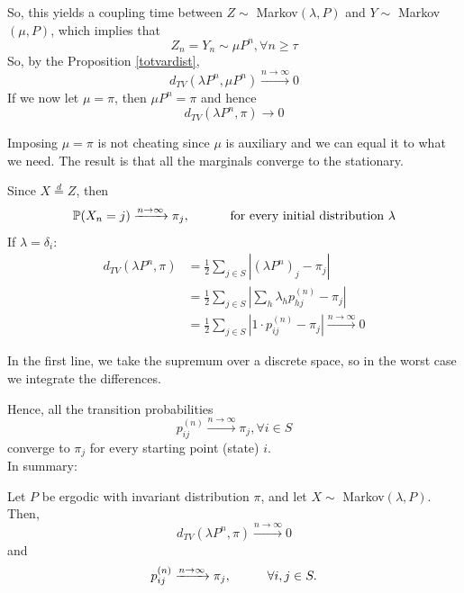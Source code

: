 \documentclass{article}
\begin{document}
So, this yields a coupling time between $Z \sim$ Markov$(\lambda, P)$ and $Y \sim$ Markov $(\mu, P)$, which implies that 
\begin{equation*}
    Z_n = Y_n \sim \mu P^n, \forall n \geq \tau
\end{equation*}
So, by the Proposition \ref{totvardist}, 
\begin{equation*}
    d_{TV}(\lambda P^n, \mu P^n) \xrightarrow{n \rightarrow \infty} 0
\end{equation*}
If we now let $\mu = \pi$, then $\mu P^n = \pi$ and hence 
\begin{equation*}
    d_{TV}(\lambda P^n, \pi) \rightarrow 0
\end{equation*}
\begin{remark}
        Imposing $\mu = \pi$ is not cheating since $\mu$ is auxiliary and we can equal it to what we need. The result is that all the marginals converge to the stationary. 
\end{remark}
Since $X \stackrel{d} = Z$, then
\begin{equation*}
    \mathbb{P}(X_n = j) \xrightarrow{n \rightarrow \infty} \pi_j, \hspace{1 cm} \text{ for every initial distribution } \lambda
\end{equation*}
If $\lambda = \delta_i$:
\begin{align*}
    d_{TV}(\lambda P^n, \pi) &= \frac{1}{2} \sum_{j \in S} |(\lambda P^n)_j - \pi_j| \\
    &= \frac{1}{2} \sum_{j \in S} |\sum_h \lambda_h p_{hj}^{(n)} - \pi_j| \\
    &= \frac{1}{2} \sum_{j \in S} |1 \cdot p_{ij}^{(n)}-\pi_j| \xrightarrow{n \rightarrow \infty} 0
\end{align*}
\begin{remark}
        In the first line, we take the supremum over a discrete space, so in the worst case we integrate the differences. 
\end{remark}
Hence, all the transition probabilities 
\begin{equation*}
    p_{ij}^{(n)} \xrightarrow{n \rightarrow \infty} \pi_j, \forall i \in S
\end{equation*}
converge to $\pi_j$ for every starting point (state) $i$.\\
In summary:
\begin{theorem}
    \label{th erg}
        Let $P$ be ergodic with invariant distribution $\pi$, and let $X \sim$ Markov$(\lambda, P)$. Then,
        \begin{equation*}
            d_{TV}(\lambda P^n, \pi) \xrightarrow{n \rightarrow \infty} 0
        \end{equation*}
        and
        \begin{equation*}
            p_{ij}^{(n)} \xrightarrow{n \rightarrow \infty} \pi_j, \hspace{1 cm} \forall i,j \in S. 
        \end{equation*}
\end{theorem}
\end{document}
